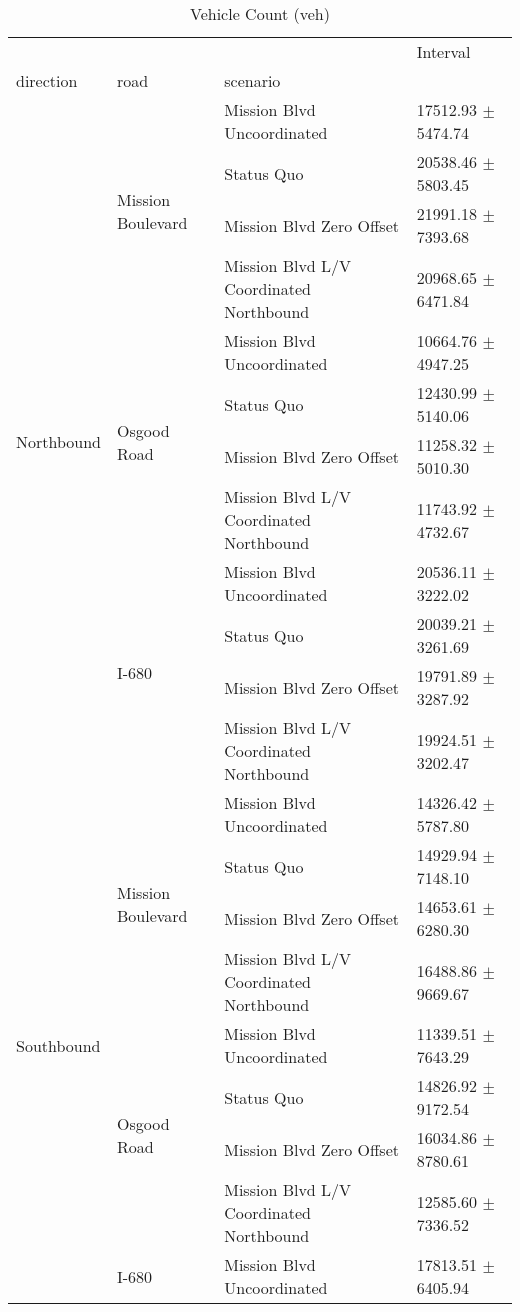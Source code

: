 \begin{table}
\caption{Vehicle Count (veh)}
\begin{tabular}{llll}
\toprule
 &  &  & Interval \\
direction & road & scenario &  \\
\midrule
\multirow[t]{12}{*}{Northbound} & \multirow[t]{4}{*}{Mission Boulevard} & Mission Blvd Uncoordinated & 17512.93 $\pm$ 5474.74 \\
 &  & Status Quo & 20538.46 $\pm$ 5803.45 \\
 &  & Mission Blvd Zero Offset & 21991.18 $\pm$ 7393.68 \\
 &  & Mission Blvd L/V Coordinated Northbound & 20968.65 $\pm$ 6471.84 \\
 & \multirow[t]{4}{*}{Osgood Road} & Mission Blvd Uncoordinated & 10664.76 $\pm$ 4947.25 \\
 &  & Status Quo & 12430.99 $\pm$ 5140.06 \\
 &  & Mission Blvd Zero Offset & 11258.32 $\pm$ 5010.30 \\
 &  & Mission Blvd L/V Coordinated Northbound & 11743.92 $\pm$ 4732.67 \\
 & \multirow[t]{4}{*}{I-680} & Mission Blvd Uncoordinated & 20536.11 $\pm$ 3222.02 \\
 &  & Status Quo & 20039.21 $\pm$ 3261.69 \\
 &  & Mission Blvd Zero Offset & 19791.89 $\pm$ 3287.92 \\
 &  & Mission Blvd L/V Coordinated Northbound & 19924.51 $\pm$ 3202.47 \\
\multirow[t]{12}{*}{Southbound} & \multirow[t]{4}{*}{Mission Boulevard} & Mission Blvd Uncoordinated & 14326.42 $\pm$ 5787.80 \\
 &  & Status Quo & 14929.94 $\pm$ 7148.10 \\
 &  & Mission Blvd Zero Offset & 14653.61 $\pm$ 6280.30 \\
 &  & Mission Blvd L/V Coordinated Northbound & 16488.86 $\pm$ 9669.67 \\
 & \multirow[t]{4}{*}{Osgood Road} & Mission Blvd Uncoordinated & 11339.51 $\pm$ 7643.29 \\
 &  & Status Quo & 14826.92 $\pm$ 9172.54 \\
 &  & Mission Blvd Zero Offset & 16034.86 $\pm$ 8780.61 \\
 &  & Mission Blvd L/V Coordinated Northbound & 12585.60 $\pm$ 7336.52 \\
 & \multirow[t]{4}{*}{I-680} & Mission Blvd Uncoordinated & 17813.51 $\pm$ 6405.94 \\

\end{tabular}
\end{table}
